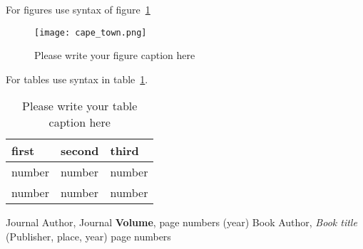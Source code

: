 \documentclass{webofc}
\begin{document}
For figures use syntax of figure~\ref{fig-1}
\begin{figure}[h]
\centering
\texttt{[image: cape\_town.png]}
\caption{Please write your figure caption here}
\label{fig-1}       %
\end{figure}

For tables use syntax in table~\ref{tab-1}.
\begin{table}
\centering
\caption{Please write your table caption here}
\label{tab-1}       %
\begin{tabular}{lll}
\hline
first & second & third  \\\hline
number & number & number \\
number & number & number \\\hline
\end{tabular}
\vspace*{5cm}  %
\end{table}
%
% 
%
%
\begin{thebibliography}{}
%
%
Journal Author, Journal \textbf{Volume}, page numbers (year)
Book Author, \textit{Book title} (Publisher, place, year) page numbers
\end{thebibliography}
\end{document}
